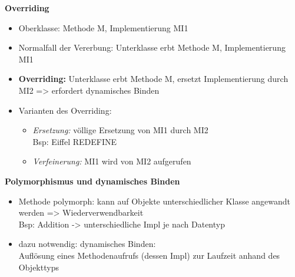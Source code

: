 \textbf{Overriding}
\begin{itemize}
	\item Oberklasse: Methode M, Implementierung MI1
	\item Normalfall der Vererbung: Unterklasse erbt Methode M, Implementierung MI1
	\item \textbf{Overriding:} Unterklasse erbt Methode M, ersetzt Implementierung durch MI2 => erfordert dynamisches Binden
	\item Varianten des Overriding:
	\begin{itemize}
		\item \textit{Ersetzung:} völlige Ersetzung von MI1 durch MI2\\
		Bsp: Eiffel REDEFINE
		
		\item \textit{Verfeinerung:} MI1 wird von MI2 aufgerufen 
	\end{itemize}
\end{itemize}

\textbf{Polymorphismus und dynamisches Binden}
\begin{itemize}
	\item Methode polymorph: kann auf Objekte unterschiedlicher Klasse angewandt werden => Wiederverwendbarkeit\\
	Bsp: Addition -> unterschiedliche Impl je nach Datentyp
	
	\item dazu notwendig: dynamisches Binden:\\
	Auflösung eines Methodenaufrufs (dessen Impl) zur Laufzeit anhand des Objekttyps
\end{itemize}

